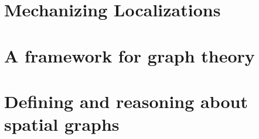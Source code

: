 \documentclass[preprint,10pt]{sigplanconf}
\begin{document}


\section{Mechanizing Localizations}
\label{sec:localizations}


\section{A framework for graph theory}
\label{sec:mathgraph}



\section{Defining and reasoning about spatial graphs}
\label{sec:spacegraph}





%


%

%
\end{document}
